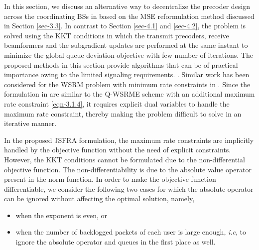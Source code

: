 
In this section, we discuss an alternative way to decentralize the precoder design across the coordinating \acp{BS} in  based on the \ac{MSE} reformulation method discussed in Section \ref{sec-3.3}. In contrast to Section \ref{sec-4.1} and \ref{sec-4.2}, the problem is solved using the \ac{KKT} conditions in which the transmit precoders, receive beamformers and the subgradient updates are performed at the same instant to minimize the global queue deviation objective with few number of iterations. The proposed methods in this section provide algorithms that can be of practical importance owing to the limited signaling requirements. .  Similar work has been considered for the \ac{WSRM} problem with minimum rate constraints in \cite{kaleva2013decentralized,kaleva2013primal}. Since the formulation in \cite{kaleva2013decentralized,kaleva2013primal} are similar to the \ac{Q-WSRME} scheme with an additional maximum rate constraint \eqref{eqn-3.1.4}, it requires explicit dual variables to handle the maximum rate constraint, thereby making the problem difficult to solve in an iterative manner.

In the proposed \ac{JSFRA} formulation, the maximum rate constraints are implicitly handled by the objective function without the need of explicit constraints. However, the \ac{KKT} conditions cannot be formulated due to the non-differential objective function. The non-differentiability is due to the absolute value operator present in the norm function. In order to make the objective function differentiable, we consider the following two cases for which the absolute operator can be ignored without affecting the optimal solution, namely,
\begin{itemize}
\item when the exponent  is even, or
\item when the number of backlogged packets of each user is large enough, \textit{i.e},  to ignore the absolute operator and queues in the first place as well.
\end{itemize}

